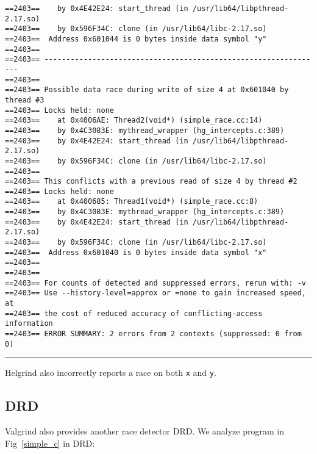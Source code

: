 {\begin{verbatim}
==2403==    by 0x4E42E24: start_thread (in /usr/lib64/libpthread-2.17.so)
==2403==    by 0x596F34C: clone (in /usr/lib64/libc-2.17.so)
==2403==  Address 0x601044 is 0 bytes inside data symbol "y"
==2403== 
==2403== ----------------------------------------------------------------
==2403== 
==2403== Possible data race during write of size 4 at 0x601040 by thread #3
==2403== Locks held: none
==2403==    at 0x4006AE: Thread2(void*) (simple_race.cc:14)
==2403==    by 0x4C3083E: mythread_wrapper (hg_intercepts.c:389)
==2403==    by 0x4E42E24: start_thread (in /usr/lib64/libpthread-2.17.so)
==2403==    by 0x596F34C: clone (in /usr/lib64/libc-2.17.so)
==2403== 
==2403== This conflicts with a previous read of size 4 by thread #2
==2403== Locks held: none
==2403==    at 0x400685: Thread1(void*) (simple_race.cc:8)
==2403==    by 0x4C3083E: mythread_wrapper (hg_intercepts.c:389)
==2403==    by 0x4E42E24: start_thread (in /usr/lib64/libpthread-2.17.so)
==2403==    by 0x596F34C: clone (in /usr/lib64/libc-2.17.so)
==2403==  Address 0x601040 is 0 bytes inside data symbol "x"
==2403== 
==2403== 
==2403== For counts of detected and suppressed errors, rerun with: -v
==2403== Use --history-level=approx or =none to gain increased speed, at
==2403== the cost of reduced accuracy of conflicting-access information
==2403== ERROR SUMMARY: 2 errors from 2 contexts (suppressed: 0 from 0)
\end{verbatim}
}

\hrule
\vspace{0.5cm}

Helgrind also incorrectly reports a race on both \texttt{x} and \texttt{y}.

\subsection{DRD}

Valgrind also provides another race detector DRD.
We analyze program in Fig~\ref{simple_c} in DRD:

